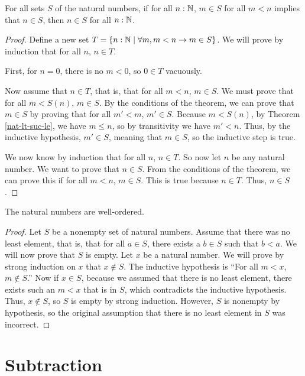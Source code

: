 \documentclass[../math.tex]{subfiles}
\begin{document}
\begin{theorem}
    For all sets $S$ of the natural numbers, if for all $n : \mathbb{N}$, $m \in S$ for
    all $m < n$ implies that $n \in S$, then $n \in S$ for all $n : \mathbb{N}$.
\end{theorem}
\begin{proof}
    Define a new set $T = \{n : \mathbb{N} \mid \forall m, m < n \rightarrow m \in S\}$.
    We will prove by induction that for all $n$, $n \in T$.

    First, for $n = 0$, there is no $m < 0$, so $0 \in T$ vacuously.

    Now assume that $n \in T$, that is, that for all $m < n$, $m \in S$.  We
    must prove that for all $m < S(n)$, $m \in S$.  By the conditions of the
    theorem, we can prove that $m \in S$ by proving that for all $m' < m$, $m'
    \in S$.  Because $m < S(n)$, by Theorem \ref{nat-lt-suc-le}, we have $m \leq
    n$, so by transitivity we have $m' < n$.  Thus, by the inductive hypothesis,
    $m' \in S$, meaning that $m \in S$, so the inductive step is true.

    We now know by induction that for all $n$, $n \in T$.  So now let $n$ be any
    natural number.  We want to prove that $n \in S$.  From the conditions of
    the theorem, we can prove this if for all $m < n$, $m \in S$.  This is true
    because $n \in T$.  Thus, $n \in S$.
\end{proof}

\begin{instance}
    The natural numbers are well-ordered.
\end{instance}
\begin{proof}
    Let $S$ be a nonempty set of natural numbers.  Assume that there was no
    least element, that is, that for all $a \in S$, there exists a $b \in S$
    such that $b < a$.  We will now prove that $S$ is empty.  Let $x$ be a
    natural number.  We will prove by strong induction on $x$ that $x \notin S$.
    The inductive hypothesis is ``For all $m < x$, $m \notin S$.''  Now if $x
    \in S$, because we assumed that there is no least element, there exists such
    an $m < x$ that is in $S$, which contradicts the inductive hypothesis.
    Thus, $x \notin S$, so $S$ is empty by strong induction.  However, $S$ is
    nonempty by hypothesis, so the original assumption that there is no least
    element in $S$ was incorrect.
\end{proof}

\section{Subtraction}
\end{document}
